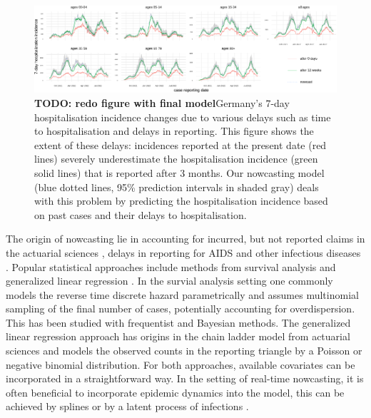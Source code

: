 \begin{figure}

{\centering \includegraphics[width=\textwidth]{figures_tentative/delays_in_reporting-1.pdf} 

}

\caption{\textbf{TODO: redo figure with final model}Germany's $7$-day hospitalisation incidence changes due to various delays such as time to hospitalisation and delays in reporting. This figure shows the extent of these delays: incidences reported at the present date (red lines) severely underestimate the hospitalisation incidence (green solid lines) that is reported after $3$ months. Our nowcasting model (blue dotted lines, 95\% prediction intervals in shaded gray) deals with this problem by predicting the hospitalisation incidence based on past cases and their delays to hospitalisation.}\label{fig:delays_in_reporting}
\end{figure}

The origin of nowcasting lie in accounting for incurred, but not reported claims in the actuarial sciences \citep{Kaminsky1987Prediction}, delays in reporting for AIDS \citep{Zeger1989Statistical,Lawless1994Adjustments} and other infectious diseases \citep{Farrington1996Statistical}. Popular statistical approaches include methods from survival analysis \citep{Lawless1994Adjustments} and generalized linear regression \citep{Zeger1989Statistical}. In the survial analysis setting one commonly models the reverse time discrete hazard parametrically and assumes multinomial sampling of the final number of cases, potentially accounting for overdispersion. This has been studied with frequentist \citep{Midthune2005Modeling} and Bayesian \citep{Hohle2014Bayesian,AnDerHeiden2020Schatzung} methods. The generalized linear regression approach has origins in the chain ladder model from actuarial sciences \citep{Renshaw1998Stochastic} and models the observed counts in the reporting triangle by a Poisson or negative binomial distribution.
For both approaches, available covariates can be incorporated in a straightforward way. In the setting of real-time nowcasting, it is often beneficial to incorporate epidemic dynamics into the model, this can be achieved by splines \citep{Hohle2014Bayesian,vandeKassteele2019Nowcasting} or by a latent process of infections \citep{McGough2020Nowcasting}.

